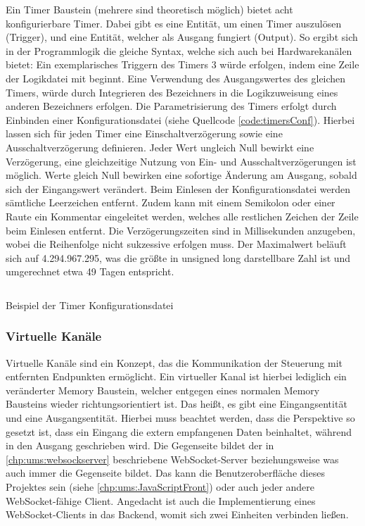 Ein Timer Baustein (mehrere sind theoretisch möglich) bietet acht konfigurierbare Timer. Dabei gibt es eine Entität, um einen Timer auszulösen  (Trigger), und eine Entität, welcher als Ausgang fungiert  (Output). So ergibt sich in der Programmlogik die gleiche Syntax, welche sich auch bei Hardwarekanälen bietet: Ein exemplarisches Triggern des Timers 3 würde erfolgen, indem eine Zeile der Logikdatei mit \chphl{[Tt3=]} beginnt. Eine Verwendung des Ausgangswertes des gleichen Timers, würde durch Integrieren des Bezeichners \chphl{[To3]} in die Logikzuweisung eines anderen Bezeichners erfolgen. Die Parametrisierung des Timers erfolgt durch Einbinden einer Konfigurationsdatei (siehe Quellcode \ref{code:timersConf}). Hierbei lassen sich für jeden Timer eine Einschaltverzögerung sowie eine Ausschaltverzögerung definieren. Jeder Wert ungleich Null bewirkt eine Verzögerung, eine gleichzeitige Nutzung von Ein- und Ausschaltverzögerungen ist möglich. Werte gleich Null bewirken eine sofortige Änderung am Ausgang, sobald sich der Eingangswert verändert. Beim Einlesen der Konfigurationsdatei werden sämtliche Leerzeichen entfernt. Zudem kann mit einem Semikolon \chphl{;} oder einer Raute \chphl{\#} ein Kommentar eingeleitet werden, welches alle restlichen Zeichen der Zeile beim Einlesen entfernt. Die Verzögerungszeiten sind in Millisekunden anzugeben, wobei die Reihenfolge nicht sukzessive erfolgen muss. Der Maximalwert beläuft sich auf 4.294.967.295, was die größte in unsigned long darstellbare Zahl ist und umgerechnet etwa 49 Tagen entspricht. 
\begin{listing}[H]
	\inputminted[numbersep=1pt,fontsize=\scriptsize,frame=single, firstline=14,lastline=25]{c}{./code/timers.conf}
	\caption{Beispiel der Timer Konfigurationsdatei}
	\label{code:timersConf}
\end{listing}


\subsubsection{Virtuelle Kanäle}\label{kap:ums:virtualchannel}
Virtuelle Kanäle sind ein Konzept, das die Kommunikation der Steuerung mit entfernten Endpunkten ermöglicht. Ein virtueller Kanal ist hierbei lediglich ein veränderter Memory Baustein, welcher entgegen eines normalen Memory Bausteins wieder richtungsorientiert ist. Das heißt, es gibt eine Eingangsentität und eine Ausgangsentität. Hierbei muss beachtet werden, dass die Perspektive so gesetzt ist, dass ein Eingang die extern empfangenen Daten beinhaltet, während in den Ausgang geschrieben wird. Die Gegenseite bildet der in \autoref{chp:ums:websockserver} beschriebene WebSocket-Server beziehungsweise was auch immer die Gegenseite bildet. Das kann die Benutzeroberfläche dieses Projektes sein (siehe \autoref{chp:ums:JavaScriptFront}) oder auch jeder andere WebSocket-fähige Client. Angedacht ist auch die Implementierung eines WebSocket-Clients in das Backend, womit sich zwei Einheiten verbinden ließen. 


